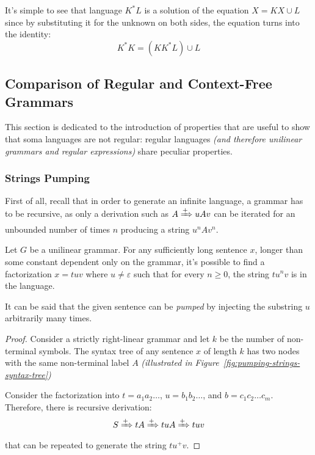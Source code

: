 \documentclass[english]{article}
\begin{document}
It's simple to see that language \(K^\ast L\) is a solution of the equation \(X = K X \cup L\) since by substituting it for the unknown on both sides, the equation turns into the identity:
\[ K^\ast K = (K K^\ast L) \cup L \]

\subsection{Comparison of Regular and Context-Free Grammars}

This section is dedicated to the introduction of properties that are useful to show that soma languages are not regular:
regular languages \textit{(and therefore unilinear grammars and regular expressions)} share peculiar properties.

\subsubsection{Strings Pumping}

First of all, recall that in order to generate an infinite language, a grammar has to be recursive, as only a derivation such as \(A \xRightarrow{+} u A v\) can be iterated for an unbounded number of times \(n\) producing a string \(u^n A v^n\).

\begin{theorem}
  Let \(G\) be a unilinear grammar.
  For any sufficiently long sentence \(x\), longer than some constant dependent only on the grammar, it's possible to find a factorization \(x = tuv\) where \(u \neq \varepsilon\) such that for every \(n \geq 0\), the string \(t u^n v\) is in the language.
\end{theorem}

It can be said that the given sentence can be \textit{pumped} by injecting the substring \(u\) arbitrarily many times.

\begin{proof}
  Consider a strictly right-linear grammar and let \(k\) be the number of non-terminal symbols.
  The syntax tree of any sentence \(x\) of length \(k\) has two nodes with the same non-terminal label \(A\) \textit{(illustrated in Figure~\ref{fig:pumping-strings-syntax-tree})}

  Consider the factorization into \(t = a_1 a_2 \ldots\), \(u = b_1 b_2 \ldots\), and \(b = c_1 c_2 \ldots c_m\).
  Therefore, there is recursive derivation:
  \[S \xRightarrow{+} t A \xRightarrow{+} tuA \xRightarrow{+} tuv \]
  that can be repeated to generate the string \(tu^+ v\).
\end{proof}
\end{document}
